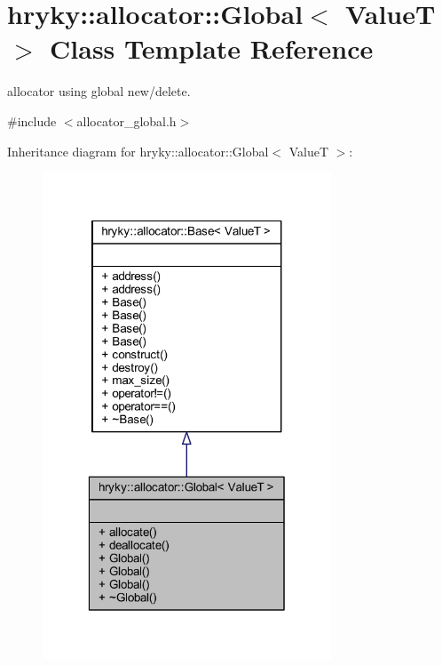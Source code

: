 \hypertarget{classhryky_1_1allocator_1_1_global}{\section{hryky\-:\-:allocator\-:\-:Global$<$ Value\-T $>$ Class Template Reference}
\label{classhryky_1_1allocator_1_1_global}
}


allocator using global new/delete.  




{\ttfamily \#include $<$allocator\-\_\-global.\-h$>$}



Inheritance diagram for hryky\-:\-:allocator\-:\-:Global$<$ Value\-T $>$\-:
\nopagebreak
\begin{figure}[H]
\begin{center}
\leavevmode
\includegraphics[width=244pt]{classhryky_1_1allocator_1_1_global__inherit__graph}
\end{center}
\end{figure}
